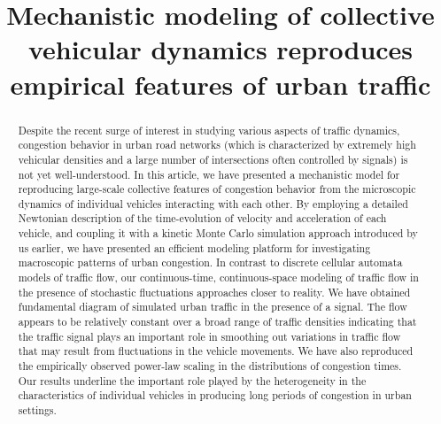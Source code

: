 \documentclass[conference]{IEEEtran}
\begin{document}
\title{Mechanistic modeling of collective vehicular dynamics reproduces empirical features of urban traffic}

\author{
}

\maketitle


\begin{abstract}
Despite the recent surge of interest in studying various aspects of
traffic dynamics, congestion behavior in urban road networks (which is
characterized by extremely high vehicular densities and a large number
of intersections often controlled by signals) is not
yet well-understood.  In this article, we have presented a
mechanistic model for reproducing large-scale collective features of
congestion behavior from
the microscopic dynamics of individual vehicles interacting with each
other. By employing a detailed Newtonian description of the
time-evolution of velocity and acceleration of each vehicle, and
coupling it with a kinetic Monte Carlo simulation approach introduced
by us earlier,
we have presented an efficient modeling platform for investigating
macroscopic patterns of urban
congestion. In contrast to discrete cellular automata
models of traffic flow, our continuous-time, continuous-space modeling
of traffic flow in the presence of stochastic fluctuations 
approaches closer to reality. We have obtained fundamental diagram of
simulated urban traffic in the presence of a signal. The flow appears
to be relatively constant over a broad range of traffic densities
indicating that the traffic signal plays an important role in
smoothing out variations in traffic flow
that may result from fluctuations in the vehicle movements. 
We have also reproduced the empirically observed power-law scaling in
the distributions of congestion times. Our results underline the
important role played by the heterogeneity in the characteristics of
individual vehicles in producing long periods of congestion in urban
settings.
\end{abstract}
\end{document}
